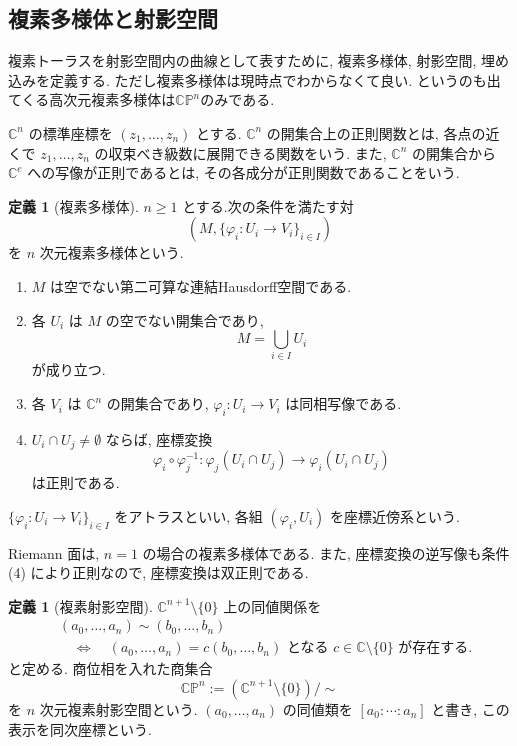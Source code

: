 \documentclass[dvipdfmx,a4paper,11pt]{article} %
\newcommand{\C}{\mathbb{C}}
\theoremstyle{definition}
\numberwithin{equation}{section}
\newtheorem{dfn}[thm]{定義}
\begin{document}
\subsection{複素多様体と射影空間}\label{O-S026}

複素トーラスを射影空間内の曲線として表すために, 
複素多様体, 射影空間, 埋め込みを定義する.
ただし複素多様体は現時点でわからなくて良い. というのも出てくる高次元複素多様体は$\C\mathbb P^n$のみである. 


$\C^n$ の標準座標を $(z_1,\ldots,z_n)$ とする.
$\C^n$ の開集合上の正則関数とは, 
各点の近くで $z_1,\ldots,z_n$ の収束べき級数に展開できる関数をいう.
また, $\C^n$ の開集合から $\C^e$ への写像が正則であるとは, 
その各成分が正則関数であることをいう.

\begin{dfn}[複素多様体]\label{O-M121}
$n\geq1$ とする.次の条件を満たす対
\[
\left(M,\{\varphi_i:U_i\to V_i\}_{i\in I}\right)
\]
を $n$ 次元複素多様体という.
\begin{enumerate}
\item
$M$ は空でない第二可算な連結Hausdorff空間である.

\item
各 $U_i$ は $M$ の空でない開集合であり, 
\[
M=\bigcup_{i\in I}U_i
\]
が成り立つ.

\item
各 $V_i$ は $\C^n$ の開集合であり, 
$\varphi_i:U_i\to V_i$ は同相写像である.

\item
$U_i\cap U_j\neq\emptyset$ ならば, 座標変換
\[
\varphi_i\circ\varphi_j^{-1}:
\varphi_j(U_i\cap U_j)\longrightarrow
\varphi_i(U_i\cap U_j)
\]
は正則である.
\end{enumerate}
$\{\varphi_i:U_i\to V_i\}_{i\in I}$ をアトラスといい, 
各組 $(\varphi_i,U_i)$ を座標近傍系という.
\end{dfn}

Riemann 面は, $n=1$ の場合の複素多様体である.
また, 座標変換の逆写像も条件 (4) により正則なので, 
座標変換は双正則である.



\begin{dfn}[複素射影空間]\label{O-M122}
$\C^{n+1}\setminus\{0\}$ 上の同値関係を
\[
\begin{aligned}
&(a_0,\ldots,a_n)\sim(b_0,\ldots,b_n)\\
&\quad\Longleftrightarrow\quad
(a_0,\ldots,a_n)=c(b_0,\ldots,b_n)
\text{ となる }c\in\C\setminus\{0\}\text{ が存在する}.
\end{aligned}
\]
と定める.
商位相を入れた商集合
\[
\C\mathbb P^n:=(\C^{n+1}\setminus\{0\})/\sim
\]
を $n$ 次元複素射影空間という.
$(a_0,\ldots,a_n)$ の同値類を
$[a_0:\cdots:a_n]$ と書き, この表示を同次座標という.
\end{dfn}
\end{document}
